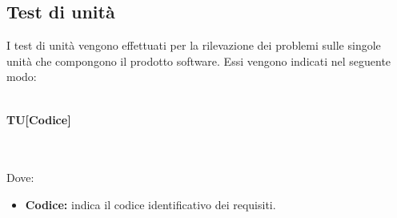 \subsection{Test di unità}
I test di unità vengono effettuati per la rilevazione dei problemi sulle singole unità che compongono il prodotto software. Essi vengono indicati nel seguente modo:\\\\
\centerline{\textbf{TU[Codice]}}\\\\
Dove:
\begin{itemize}
	\item \textbf{Codice:} indica il codice identificativo dei requisiti.
\end{itemize}


\renewcommand{\arraystretch}{1.5}
